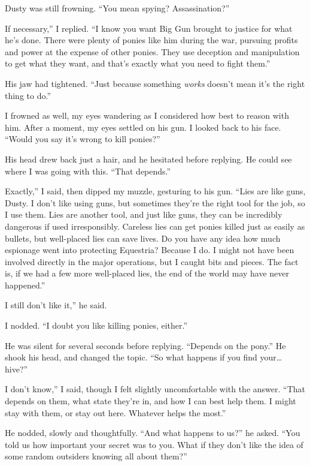 Dusty was still frowning. “You mean spying? Assassination?”

\leavevmode{}If necessary,” I replied. “I know you want Big Gun brought to justice for what he’s done. There were plenty of ponies like him during the war, pursuing profits and power at the expense of other ponies. They use deception and manipulation to get what they want, and that’s exactly what you need to fight them.”

His jaw had tightened. “Just because something \textit{works} doesn’t mean it’s the right thing to do.”

I frowned as well, my eyes wandering as I considered how best to reason with him. After a moment, my eyes settled on his gun. I looked back to his face. “Would you say it’s wrong to kill ponies?”

His head drew back just a hair, and he hesitated before replying. He could see where I was going with this. “That depends.”

\leavevmode{}Exactly,” I said, then dipped my muzzle, gesturing to his gun. “Lies are like guns, Dusty. I don’t like using guns, but sometimes they’re the right tool for the job, so I use them. Lies are another tool, and just like guns, they can be incredibly dangerous if used irresponsibly. Careless lies can get ponies killed just as easily as bullets, but well-placed lies can save lives. Do you have any idea how much espionage went into protecting Equestria? Because I do. I might not have been involved directly in the major operations, but I caught bits and pieces. The fact is, if we had a few more well-placed lies, the end of the world may have never happened.”

\leavevmode{}I still don’t like it,” he said.

I nodded. “I doubt you like killing ponies, either.”

He was silent for several seconds before replying. “Depends on the pony.” He shook his head, and changed the topic. “So what happens if you find your… hive?”

\leavevmode{}I don’t know,” I said, though I felt slightly uncomfortable with the answer. “That depends on them, what state they’re in, and how I can best help them. I might stay with them, or stay out here. Whatever helps the most.”

He nodded, slowly and thoughtfully. “And what happens to us?” he asked. “You told us how important your secret was to you. What if they don’t like the idea of some random outsiders knowing all about them?”

